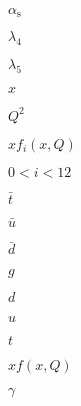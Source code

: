\documentclass{article}
\begin{document}
$ \alpha_\mathrm{s} $
\pagebreak

$ \lambda_4 $
\pagebreak

$ \lambda_5 $
\pagebreak

$ x $
\pagebreak

$ Q^2 $
\pagebreak

$ x f_i(x, Q) $
\pagebreak

$ 0 < i < 12 $
\pagebreak

$ \bar{t} $
\pagebreak

$ \bar{u} $
\pagebreak

$ \bar{d} $
\pagebreak

$ g $
\pagebreak

$ d $
\pagebreak

$ u $
\pagebreak

$ t $
\pagebreak

$ x f(x, Q) $
\pagebreak

$ \gamma $
\pagebreak
\end{document}
